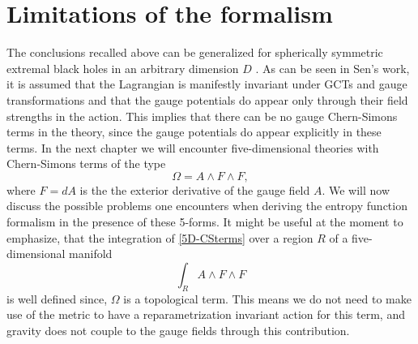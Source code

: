 \documentclass[12pt,twoside]{book}
\begin{document}
\section{Limitations of the formalism}
\label{sec:limSenFormalism}

The conclusions recalled above can be generalized for spherically symmetric extremal black holes in an arbitrary dimension $D$ \cite{Sen:2007fk}. As can be seen in Sen's work, it is assumed that the Lagrangian is manifestly invariant under GCTs and gauge transformations and that the gauge potentials do appear only through their field strengths in the action. This implies that there can be no gauge Chern-Simons terms in the theory, since the gauge potentials do appear explicitly in these terms. In the next chapter we will encounter five-dimensional theories with Chern-Simons terms of the type
\begin{equation}\label{5D-CSterms}
\Omega = A \wedge F \wedge F,
\end{equation}
where $F = dA$ is the the exterior derivative of the gauge field $A$. We will now discuss the possible problems one encounters when deriving the entropy function formalism in the presence of these 5-forms. It might be useful at the moment to emphasize, that the integration of \eqref{5D-CSterms} over a region $R$ of a five-dimensional manifold
\begin{equation}\label{Int5D-CSterms}
\int_{R} A \wedge F \wedge F
\end{equation}
is well defined since, $\Omega$ is a topological term. This means we do not need to make use of the metric to have a reparametrization invariant action for this term, and gravity does not couple to the gauge fields through this contribution.\newline
\end{document}
